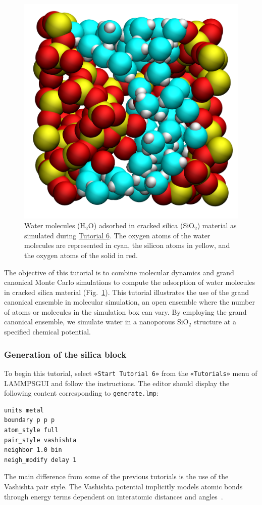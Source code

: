 \documentclass[9pt,tutorial]{livecoms}
\newcommand{\lmpcmd}[1]{\hspace{0pt}\colorbox{listing}{\textcolor{command}{\small{#1}}}\hspace{0pt}} %
\newcommand{\flecmd}[1]{\textcolor{command}{\texttt{#1}}} %
\newcommand{\guicmd}[1]{\textcolor{command}{\texttt{«#1»}}} %
\newcommand{\lammpsgui}{\textsf{LAMMPS\textendash GUI}}
\begin{document}
\begin{figure}
\centering
\includegraphics[width=0.6\linewidth]{GCMC}
\caption{Water molecules (H$_2$O) adsorbed in cracked silica (SiO$_2$) material as simulated
during \hyperref[gcmc-silica-label]{Tutorial 6}.  The oxygen atoms of the water
molecules are represented in cyan, the silicon atoms in yellow, and the oxygen
atoms of the solid in red.}
\label{fig:GCMC}
\end{figure}

The objective of this tutorial is to combine molecular dynamics and
grand canonical Monte Carlo simulations to compute the adsorption of water
molecules in cracked silica material (Fig.~\ref{fig:GCMC}).  This tutorial
illustrates the use of the grand canonical ensemble in molecular simulation, an
open ensemble where the number of atoms or molecules in the simulation box can vary.
By employing the grand canonical ensemble, {\color{blue}we simulate water in a nanoporous
SiO$_2$ structure at a specified chemical potential.}

\subsubsection{Generation of the silica block}

To begin this tutorial, select \guicmd{Start Tutorial 6} from the
\guicmd{Tutorials} menu of \lammpsgui{} and follow the instructions.
The editor should display the following content corresponding to \flecmd{generate.lmp}:
\begin{lstlisting}
units metal
boundary p p p
atom_style full
pair_style vashishta
neighbor 1.0 bin
neigh_modify delay 1
\end{lstlisting}
The main difference from some of the previous tutorials is the use of the \lmpcmd{Vashishta}
pair style.  The Vashishta potential implicitly models atomic bonds through
energy terms dependent on interatomic distances and angles~\cite{vashishta1990interaction}.
\end{document}
